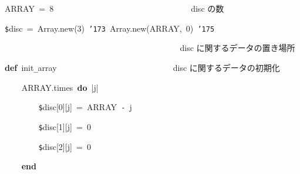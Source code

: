 \documentclass[a4paper,10pt]{article}
\def\mc{\relax}
\begin{document}
\noindent
\mbox{}ARRAY{\tt\mc \ }={\tt\mc \ }8{\tt\mc \ }{\tt\mc \ }{\tt\mc \ }{\tt\mc \ }{\tt\mc \ }{\tt\mc \ }{\tt\mc \ }{\tt\mc \ }{\tt\mc \ }{\tt\mc \ }{\tt\mc \ }{\tt\mc \ }{\tt\mc \ }{\tt\mc \ }{\tt\mc \ }{\tt\mc \ }{\tt\mc \ }{\tt\mc \ }{\tt\mc \ }{\tt\mc \ }{\tt\mc \ }{\tt\mc \ }{\tt\mc \ }{\tt\mc \ }{\tt\mc \ }{\tt\mc \ }{\tt\mc \ }{\tt\mc \ }{\tt\mc \ }{\tt\mc \ }{\tt\mc \ }\rm\mc {\tt\#} \ disc の数 \hfill 
\tt\mc 

\noindent
\mbox{}\hfill

\noindent
\mbox{}{\tt\$}disc{\tt\mc \ }={\tt\mc \ }Array.new(3){\tt\mc \ }{\tt\char'173}{\tt\mc \ }Array.new(ARRAY,{\tt\mc \ }0){\tt\mc \ }{\tt\char'175}

\noindent
\mbox{}{\tt\mc \ }{\tt\mc \ }{\tt\mc \ }{\tt\mc \ }{\tt\mc \ }{\tt\mc \ }{\tt\mc \ }{\tt\mc \ }{\tt\mc \ }{\tt\mc \ }{\tt\mc \ }{\tt\mc \ }{\tt\mc \ }{\tt\mc \ }{\tt\mc \ }{\tt\mc \ }{\tt\mc \ }{\tt\mc \ }{\tt\mc \ }{\tt\mc \ }{\tt\mc \ }{\tt\mc \ }{\tt\mc \ }{\tt\mc \ }{\tt\mc \ }{\tt\mc \ }{\tt\mc \ }{\tt\mc \ }{\tt\mc \ }{\tt\mc \ }{\tt\mc \ }{\tt\mc \ }{\tt\mc \ }{\tt\mc \ }{\tt\mc \ }{\tt\mc \ }{\tt\mc \ }{\tt\mc \ }{\tt\mc \ }{\tt\mc \ }\rm\mc {\tt\#} \ disc に関するデータの置き場所\hfill 
\tt\mc 

\noindent
\mbox{}\hfill

\noindent
\mbox{}\textbf{def}{\tt\mc \ }init{\tt\_}array{\tt\mc \ }{\tt\mc \ }{\tt\mc \ }{\tt\mc \ }{\tt\mc \ }{\tt\mc \ }{\tt\mc \ }{\tt\mc \ }{\tt\mc \ }{\tt\mc \ }{\tt\mc \ }{\tt\mc \ }{\tt\mc \ }{\tt\mc \ }{\tt\mc \ }{\tt\mc \ }{\tt\mc \ }{\tt\mc \ }{\tt\mc \ }{\tt\mc \ }{\tt\mc \ }{\tt\mc \ }{\tt\mc \ }{\tt\mc \ }{\tt\mc \ }{\tt\mc \ }\rm\mc {\tt\#} \ disc に関するデータの初期化\hfill 
\tt\mc 

\noindent
\mbox{}{\tt\mc \ }{\tt\mc \ }{\tt\mc \ }{\tt\mc \ }ARRAY.times{\tt\mc \ }\textbf{do}{\tt\mc \ }|j|

\noindent
\mbox{}{\tt\mc \ }{\tt\mc \ }{\tt\mc \ }{\tt\mc \ }{\tt\mc \ }{\tt\mc \ }{\tt\mc \ }{\tt\mc \ }{\tt\$}disc[0][j]{\tt\mc \ }={\tt\mc \ }ARRAY{\tt\mc \ }{\tt -}{\tt\mc \ }j

\noindent
\mbox{}{\tt\mc \ }{\tt\mc \ }{\tt\mc \ }{\tt\mc \ }{\tt\mc \ }{\tt\mc \ }{\tt\mc \ }{\tt\mc \ }{\tt\$}disc[1][j]{\tt\mc \ }={\tt\mc \ }0

\noindent
\mbox{}{\tt\mc \ }{\tt\mc \ }{\tt\mc \ }{\tt\mc \ }{\tt\mc \ }{\tt\mc \ }{\tt\mc \ }{\tt\mc \ }{\tt\$}disc[2][j]{\tt\mc \ }={\tt\mc \ }0

\noindent
\mbox{}{\tt\mc \ }{\tt\mc \ }{\tt\mc \ }{\tt\mc \ }\textbf{end}
\end{document}
